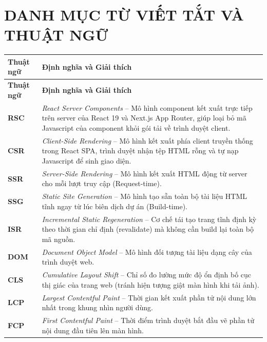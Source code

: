 \documentclass[13pt,a4paper]{extarticle}
\begin{document}
\newpage
{}

\tableofcontents
\newpage

\section*{DANH MỤC TỪ VIẾT TẮT VÀ THUẬT NGỮ}

\begin{longtable}{>{\raggedright\arraybackslash}p{3cm}>{\raggedright\arraybackslash}p{12.5cm}}
\toprule
\textbf{Thuật ngữ} & \textbf{Định nghĩa và Giải thích} \\
\midrule
\endfirsthead
\toprule
\textbf{Thuật ngữ} & \textbf{Định nghĩa và Giải thích} \\
\midrule
\endhead
\bottomrule
\endfoot
\textbf{RSC} & \textit{React Server Components} -- Mô hình component kết xuất trực tiếp trên server của React 19 và Next.js App Router, giúp loại bỏ mã Javascript của component khỏi gói tải về trình duyệt client. \\
\textbf{CSR} & \textit{Client-Side Rendering} -- Mô hình kết xuất phía client truyền thống trong React SPA, trình duyệt nhận tệp HTML rỗng và tự nạp Javascript để sinh giao diện. \\
\textbf{SSR} & \textit{Server-Side Rendering} -- Mô hình kết xuất HTML động từ server cho mỗi lượt truy cập (Request-time). \\
\textbf{SSG} & \textit{Static Site Generation} -- Mô hình tạo sẵn toàn bộ tài liệu HTML tĩnh ngay từ lúc biên dịch dự án (Build-time). \\
\textbf{ISR} & \textit{Incremental Static Regeneration} -- Cơ chế tái tạo trang tĩnh định kỳ theo thời gian chỉ định (revalidate) mà không cần build lại toàn bộ mã nguồn. \\
\textbf{DOM} & \textit{Document Object Model} -- Mô hình đối tượng tài liệu dạng cây của trình duyệt web. \\
\textbf{CLS} & \textit{Cumulative Layout Shift} -- Chỉ số đo lường mức độ ổn định bố cục thị giác của trang web (tránh hiện tượng giật màn hình khi tải ảnh). \\
\textbf{LCP} & \textit{Largest Contentful Paint} -- Thời gian kết xuất phần tử nội dung lớn nhất trong khung nhìn người dùng. \\
\textbf{FCP} & \textit{First Contentful Paint} -- Thời điểm trình duyệt bắt đầu vẽ phần tử nội dung đầu tiên lên màn hình. \\

\end{longtable}
\end{document}
